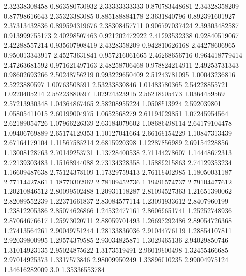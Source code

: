   2.32338308458   0.863580730932
  2.33333333333   0.870783448681
  2.34328358209    0.87798616643
  2.35323383085   0.885188884178
   2.3631840796   0.892391601927
  2.37313432836   0.899594319676
  2.38308457711   0.906797037424
  2.39303482587   0.913999755173
  2.40298507463   0.921202472922
  2.41293532338    0.92840519067
  2.42288557214   0.935607908419
   2.4328358209   0.942810626168
  2.44278606965   0.950013343917
  2.45273631841   0.957216061665
  2.46268656716   0.964418779414
  2.47263681592   0.971621497163
  2.48258706468   0.978824214911
  2.49253731343    0.98602693266
  2.50248756219   0.993229650409
  2.51243781095    1.00043236816
   2.5223880597    1.00763508591
  2.53233830846    1.01483780365
  2.54228855721     1.0220405214
  2.55223880597    1.02924323915
  2.56218905473     1.0364459569
  2.57213930348    1.04364867465
  2.58208955224     1.0508513924
    2.592039801    1.05805411015
  2.60199004975     1.0652568279
  2.61194029851    1.07245954564
  2.62189054726    1.07966226339
  2.63184079602    1.08686498114
  2.64179104478    1.09406769889
  2.65174129353    1.10127041664
  2.66169154229    1.10847313439
  2.67164179104    1.11567585214
   2.6815920398    1.12287856989
  2.69154228856    1.13008128763
  2.70149253731    1.13728400538
  2.71144278607    1.14448672313
  2.72139303483    1.15168944088
  2.73134328358    1.15889215863
  2.74129353234    1.16609487638
  2.75124378109    1.17329759413
  2.76119402985    1.18050031187
  2.77114427861    1.18770302962
  2.78109452736    1.19490574737
  2.79104477612    1.20210846512
  2.80099502488    1.20931118287
  2.81094527363    1.21651390062
  2.82089552239    1.22371661837
  2.83084577114    1.23091933612
   2.8407960199    1.23812205386
  2.85074626866    1.24532477161
  2.86069651741    1.25252748936
  2.87064676617    1.25973020711
  2.88059701493    1.26693292486
  2.89054726368    1.27413564261
  2.90049751244    1.28133836036
  2.91044776119    1.28854107811
  2.92039800995    1.29574379585
  2.93034825871     1.3029465136
  2.94029850746    1.31014923135
  2.95024875622     1.3173519491
  2.96019900498    1.32455466685
  2.97014925373     1.3317573846
  2.98009950249    1.33896010235
  2.99004975124    1.34616282009
            3.0    1.35336553784
